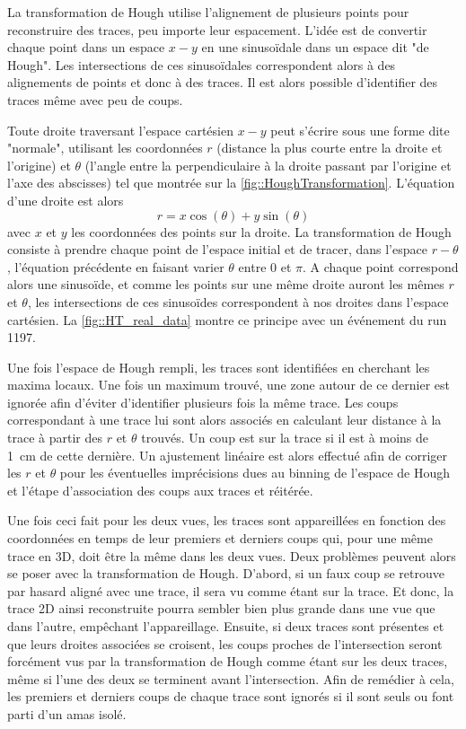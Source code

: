       La transformation de Hough utilise l'alignement de plusieurs points pour reconstruire des traces, peu importe leur espacement. L'idée est de convertir chaque point dans un espace $x-y$ en une sinusoïdale dans un espace dit "de Hough". Les intersections de ces sinusoïdales correspondent alors à des alignements de points et donc à des traces. Il est alors possible d'identifier des traces même avec peu de coups.

      Toute droite traversant l'espace cartésien $x-y$ peut s'écrire sous une forme dite "normale", utilisant les coordonnées $r$ (distance la plus courte entre la droite et l'origine) et $\theta$ (l'angle entre la perpendiculaire à la droite passant par l'origine et l'axe des abscisses) tel que montrée sur la \autoref{fig::HoughTransformation}. L'équation d'une droite est alors
      \begin{equation}\label{eq::HT}
        r=x\cos(\theta)+y\sin(\theta)
      \end{equation}
      avec $x$ et $y$ les coordonnées des points sur la droite. La transformation de Hough consiste à prendre chaque point de l'espace initial et de tracer, dans l'espace $r-\theta$, l'équation précédente en faisant varier $\theta$ entre 0 et $\pi$. A chaque point correspond alors une sinusoïde, et comme les points sur une même droite auront les mêmes $r$ et $\theta$, les intersections de ces sinusoïdes correspondent à nos droites dans l'espace cartésien. La \autoref{fig::HT_real_data} montre ce principe avec un événement du run 1197.

      Une fois l'espace de Hough rempli, les traces sont identifiées en cherchant les maxima locaux. Une fois un maximum trouvé, une zone autour de ce dernier est ignorée afin d'éviter d'identifier plusieurs fois la même trace. Les coups correspondant à une trace lui sont alors associés en calculant leur distance à la trace à partir des $r$ et $\theta$ trouvés. Un coup est sur la trace si il est à moins de \SI{1}{\centi\meter} de cette dernière. Un ajustement linéaire est alors effectué afin de corriger les $r$ et $\theta$ pour les éventuelles imprécisions dues au binning de l'espace de Hough et l'étape d'association des coups aux traces et réitérée.

      Une fois ceci fait pour les deux vues, les traces sont appareillées en fonction des coordonnées en temps de leur premiers et derniers coups qui, pour une même trace en 3D, doit être la même dans les deux vues. Deux problèmes peuvent alors se poser avec la transformation de Hough. D'abord, si un faux coup se retrouve par hasard aligné avec une trace, il sera vu comme étant sur la trace. Et donc, la trace 2D ainsi reconstruite pourra sembler bien plus grande dans une vue que dans l'autre, empêchant l'appareillage. Ensuite, si deux traces sont présentes et que leurs droites associées se croisent, les coups proches de l'intersection seront forcément vus par la transformation de Hough comme étant sur les deux traces, même si l'une des deux se terminent avant l'intersection. Afin de remédier à cela, les premiers et derniers coups de chaque trace sont ignorés si il sont seuls ou font parti d'un amas isolé.

